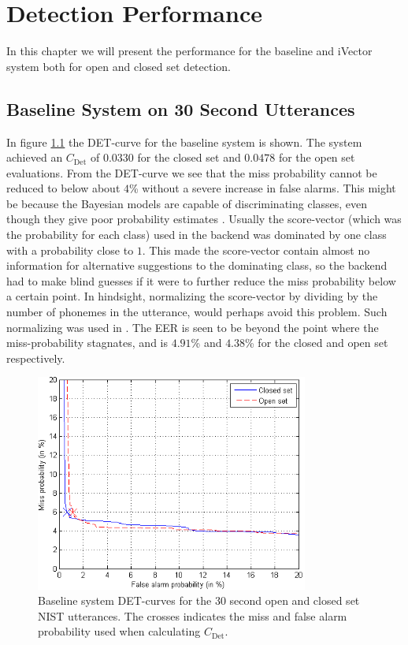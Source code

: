 \chapter{Detection Performance}

In this chapter we will present the performance for the baseline and iVector system both for open and closed set detection.

\section{Baseline System on 30 Second Utterances}

In figure \ref{fig:basedet30} the DET-curve for the baseline system is shown. The system achieved an $C_{\text{Det}}$ of $0.0330$ for the closed set and $0.0478$ for the open set evaluations. From the DET-curve we see that the miss probability cannot be reduced to below about $4$\% without a severe increase in false alarms. This might be because the Bayesian models are capable of discriminating classes, even though they give poor probability estimates \cite{mccallum1998comparison}. Usually the score-vector (which was the probability for each class) used in the backend was dominated by one class with a probability close to $1$. This made the score-vector contain almost no information for alternative suggestions to the dominating class, so the backend had to make blind guesses if it were to further reduce the miss probability below a certain point. In hindsight, normalizing the score-vector by dividing by the number of phonemes in the utterance, would perhaps avoid this problem. Such normalizing was used in \cite{matejka2006use}. The EER is seen to be beyond the point where the miss-probability stagnates, and is $4.91$\% and $4.38$\% for the closed and open set respectively.

\begin{figure}[hbt!]
\begin{center}
	\includegraphics[width=0.8\textwidth]{figures/baseDet30.png}
\end{center}
\caption{Baseline system DET-curves for the 30 second open and closed set NIST utterances. The crosses indicates the miss and false alarm probability used when calculating $C_{\text{Det}}$.}
\label{fig:basedet30}
\end{figure}


